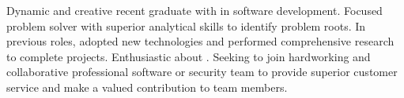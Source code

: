 

\begin{cvparagraph}

Dynamic and creative recent  graduate with  in software development. Focused problem solver with superior analytical skills to identify problem roots. In previous roles, adopted new technologies and performed comprehensive research to complete projects. Enthusiastic about . Seeking to join \putcompanynamewiths hardworking and collaborative professional software or security team to provide superior customer service and make a valued contribution to team members.
\end{cvparagraph}
